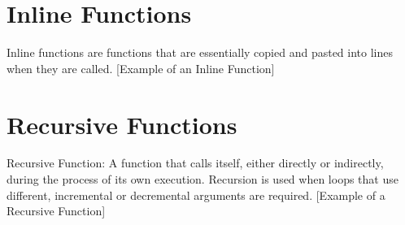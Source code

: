 \section{Inline Functions}
Inline functions are functions that are essentially copied and pasted into lines
when they are called. \begingroup
{}[Example of an Inline Function]
\endgroup

\section{Recursive Functions}
Recursive Function: A function that calls itself, either directly or indirectly,
during the process of its own execution. Recursion is used when loops that use
different, incremental or decremental arguments are required. \begingroup
{}[Example of a Recursive Function] \endgroup
